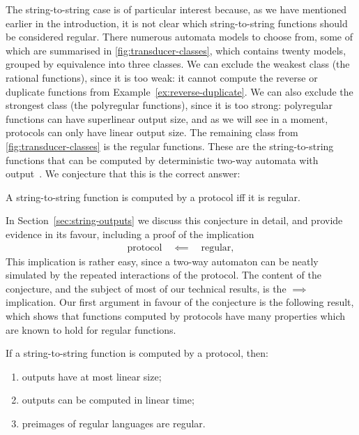 The string-to-string case is of particular interest because, as we have mentioned earlier in the introduction, it is not clear which string-to-string functions should be considered regular. There numerous automata models to choose from, some of which are summarised in \cref{fig:transducer-classes}, which contains twenty models, grouped by equivalence into three classes. We can exclude the weakest class (the rational functions), since it is too weak: it  cannot compute the reverse or duplicate functions from Example~\ref{ex:reverse-duplicate}. We can also exclude the strongest class (the polyregular functions), since it is too strong: polyregular functions can have superlinear output size, and as we will see in a moment, protocols can only have linear output size. The remaining class from \cref{fig:transducer-classes} is the regular functions. These are the string-to-string functions that can be computed by deterministic two-way automata with output~\cite{shepherdson1959reduction}. We conjecture  that this is the correct answer: 

\begin{conjecture}\label{conj:protocol-regular-string-to-string}
    A string-to-string function is computed by a protocol iff it is regular. 
\end{conjecture}

In Section~\ref{sec:string-outputs} we discuss this conjecture in detail, and provide evidence in its favour, including a proof of the  implication 
\begin{align*}
\text{protocol} \quad \impliedby \quad \text{regular},
\end{align*} 
This implication is rather easy, since a two-way automaton can be neatly simulated by the repeated interactions of the protocol. The content of the conjecture, and the subject of most of our technical results, is the $\implies$ implication. 
Our first argument in favour of  the conjecture is the following result, which shows that functions computed  by protocols have many properties which are known to hold for regular functions.

\begin{theorem}\label{thm:evidence-for-the-conjecture}
    If a string-to-string function  is  computed by a protocol, then:
    \begin{enumerate}
        \item \label{it:linear-size-outputs} outputs have at most linear size;
        \item \label{it:linear-time-computable} outputs can be   computed in linear time;
        \item \label{it:regular-preimages} preimages of regular languages are regular.
    \end{enumerate}
\end{theorem}

